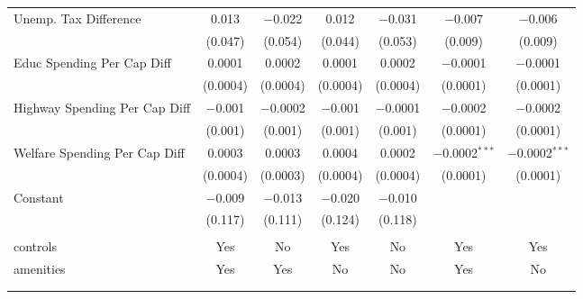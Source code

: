 \begin{table}[!htbp]
\begin{tabular}{@{\extracolsep{5pt}}lcccccc}
  Unemp. Tax Difference & 0.013 & $-$0.022 & 0.012 & $-$0.031 & $-$0.007 & $-$0.006 \\ 
  & (0.047) & (0.054) & (0.044) & (0.053) & (0.009) & (0.009) \\ 
  Educ Spending Per Cap Diff & 0.0001 & 0.0002 & 0.0001 & 0.0002 & $-$0.0001 & $-$0.0001 \\ 
  & (0.0004) & (0.0004) & (0.0004) & (0.0004) & (0.0001) & (0.0001) \\ 
  Highway Spending Per Cap Diff & $-$0.001 & $-$0.0002 & $-$0.001 & $-$0.0001 & $-$0.0002 & $-$0.0002 \\ 
  & (0.001) & (0.001) & (0.001) & (0.001) & (0.0001) & (0.0001) \\ 
  Welfare Spending Per Cap Diff & 0.0003 & 0.0003 & 0.0004 & 0.0002 & $-$0.0002$^{***}$ & $-$0.0002$^{***}$ \\ 
  & (0.0004) & (0.0003) & (0.0004) & (0.0004) & (0.0001) & (0.0001) \\ 
  Constant & $-$0.009 & $-$0.013 & $-$0.020 & $-$0.010 &  &  \\ 
  & (0.117) & (0.111) & (0.124) & (0.118) &  &  \\ 
 \hline \\[-1.8ex] 
controls & Yes & No & Yes & No & Yes & Yes \\ 
amenities & Yes & Yes & No & No & Yes & No \\ 
\hline \\[-1.8ex] 
\hline 
\hline \\[-1.8ex] 
\end{tabular} 
\end{table} 
